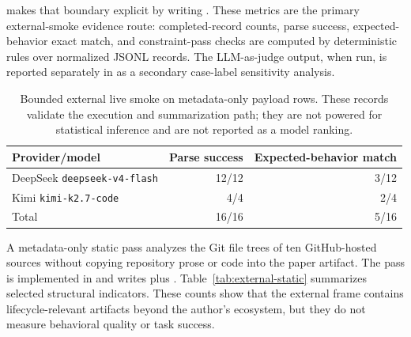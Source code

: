 \documentclass[11pt]{article}
\begin{document}
 makes that boundary
explicit by writing
. These
metrics are the primary external-smoke evidence route: completed-record counts,
parse success, expected-behavior exact match, and constraint-pass checks are
computed by deterministic rules over normalized JSONL records. The
LLM-as-judge output, when run, is reported separately in
 as a secondary
case-label sensitivity analysis.

\begin{table}[t]
\centering
\small
\begin{tabular}{lrr}
\toprule
Provider/model & Parse success & Expected-behavior match \\
\midrule
DeepSeek \texttt{deepseek-v4-flash} & 12/12 & 3/12 \\
Kimi \texttt{kimi-k2.7-code} & 4/4 & 2/4 \\
\midrule
Total & 16/16 & 5/16 \\
\bottomrule
\end{tabular}
\caption{Bounded external live smoke on metadata-only payload rows. These
records validate the execution and summarization path; they are not powered for
statistical inference and are not reported as a model ranking.}
\label{tab:external-smoke}
\end{table}

A metadata-only static pass analyzes the Git file trees of ten GitHub-hosted
sources without copying repository prose or code into the paper artifact. The
pass is implemented in  and writes
 plus
. Table~\ref{tab:external-static}
summarizes selected structural indicators. These counts show that the external
frame contains lifecycle-relevant artifacts beyond the author's ecosystem, but
they do not measure behavioral quality or task success.
\end{document}
